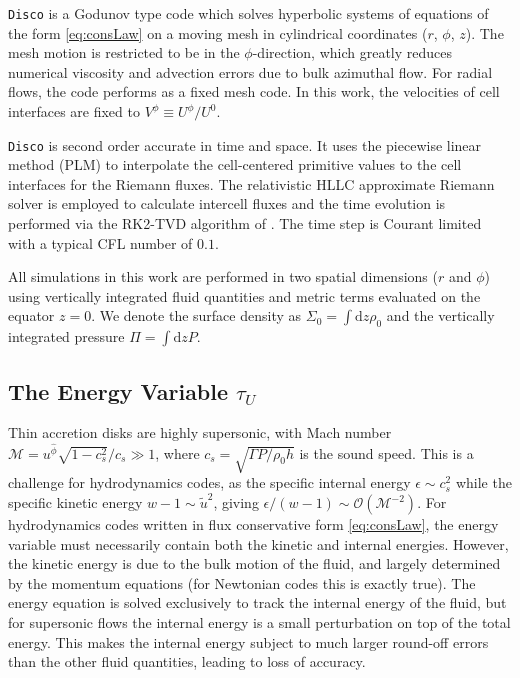 \documentclass{emulateapj}
\newcommand{\eps}{\epsilon}
\newcommand{\Sig}{\Sigma}
\newcommand{\Mach}{\mathcal{M}}
\newcommand{\dd}{\mbox{d}}
\newcommand{\Disco}{{\texttt{Disco}}}
\newcommand{\OO}{\mathcal{O}}
\begin{document}
\Disco{} is a Godunov type code which solves hyperbolic systems of equations of the form \eqref{eq:consLaw} on a moving mesh in cylindrical coordinates ($r$, $\phi$, $z$).  The mesh motion is restricted to be in the $\phi$-direction, which greatly reduces numerical viscosity and advection errors due to bulk azimuthal flow.  For radial flows, the code performs as a fixed mesh code.  In this work, the velocities of cell interfaces are fixed to $V^\phi \equiv U^\phi/U^0$.   

\Disco{} is second order accurate in time and space.  It uses the piecewise linear method (PLM) to interpolate the cell-centered primitive values to the cell interfaces for the Riemann fluxes.  The relativistic HLLC approximate Riemann solver \citep{Mignone05} is employed to calculate intercell fluxes and the time evolution is performed via the RK2-TVD algorithm of \cite{Gottlieb98}.  The time step is Courant limited with a typical CFL number of $0.1$.

All simulations in this work are performed in two spatial dimensions ($r$ and $\phi$) using vertically integrated fluid quantities and metric terms evaluated on the equator $z=0$.  We denote the surface density as $\Sig_0 = \int \dd z \rho_0$ and the vertically integrated pressure $\Pi = \int \dd z P$.  


\subsection{The Energy Variable $\tau_U$}
\label{subsec:energy}


Thin accretion disks are highly supersonic, with Mach number $\Mach = u^{\hat{\phi}} \sqrt{1-c_s^2}/c_s \gg 1$, where $c_s = \sqrt{\Gamma P / \rho_0 h}$ is the sound speed.  This is a challenge for hydrodynamics codes, as the specific internal energy $\eps \sim c_s^2$ while the specific kinetic energy $w-1 \sim \tilde{u}^2$, giving $\eps / (w-1) \sim \OO(\Mach^{-2})$.  For hydrodynamics codes written in flux conservative form \eqref{eq:consLaw}, the energy variable must necessarily contain both the kinetic and internal energies.  However, the kinetic energy is due to the bulk motion of the fluid, and largely determined by the momentum equations (for Newtonian codes this is exactly true).  The energy equation is solved exclusively to track the internal energy of the fluid, but for supersonic flows the internal energy is a small perturbation on top of the total energy.  This makes the internal energy subject to much larger round-off errors than the other fluid quantities, leading to loss of accuracy.
\end{document}
